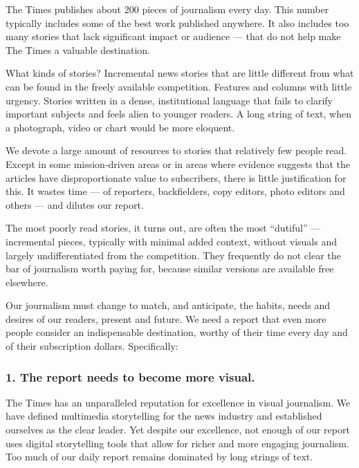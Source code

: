 The Times publishes about 200 pieces of journalism every day. This
number typically includes some of the best work published anywhere. It
also includes too many stories that lack significant impact or audience
--- that do not help make The Times a valuable destination.

What kinds of stories? Incremental news stories that are little
different from what can be found in the freely available competition.
Features and columns with little urgency. Stories written in a dense,
institutional language that fails to clarify important subjects and
feels alien to younger readers. A long string of text, when a
photograph, video or chart would be more eloquent.

We devote a large amount of resources to stories that relatively few
people read. Except in some mission-driven areas or in areas where
evidence suggests that the articles have disproportionate value to
subscribers, there is little justification for this. It wastes time ---
of reporters, backfielders, copy editors, photo editors and others ---
and dilutes our report.

The most poorly read stories, it turns out, are often the most
``dutiful'' --- incremental pieces, typically with minimal added
context, without visuals and largely undifferentiated from the
competition. They frequently do not clear the bar of journalism worth
paying for, because similar versions are available free elsewhere.

Our journalism must change to match, and anticipate, the habits, needs
and desires of our readers, present and future. We need a report that
even more people consider an indispensable destination, worthy of their
time every day and of their subscription dollars. Specifically:

\hypertarget{1-the-report-needs-to-become-more-visual}{%
\subsubsection{1. The report needs to become more
visual.}\label{1-the-report-needs-to-become-more-visual}}

The Times has an unparalleled reputation for excellence in visual
journalism. We have defined multimedia storytelling for the news
industry and established ourselves as the clear leader. Yet despite our
excellence, not enough of our report uses digital storytelling tools
that allow for richer and more engaging journalism. Too much of our
daily report remains dominated by long strings of text.

